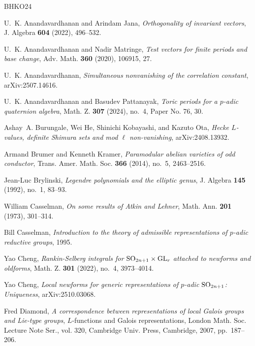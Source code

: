 \documentclass[12pt]{amsart}
\theoremstyle{definition}
\theoremstyle{remark}
\begin{document}
\begin{thebibliography}{BHKO24}

U.~K. Anandavardhanan and Arindam Jana, \emph{Orthogonality of invariant
  vectors}, J. Algebra \textbf{604} (2022), 496--532. 

U.~K. Anandavardhanan and Nadir Matringe, \emph{Test vectors for finite periods
  and base change}, Adv. Math. \textbf{360} (2020), 106915, 27. 
  
U.~K. Anandavardhanan, \emph{Simultaneous nonvanishing of the correlation
  constant}, arXiv:2507.14616.

U.~K. Anandavardhanan and Basudev Pattanayak, \emph{Toric periods for a
  {$p$}-adic quaternion algebra}, Math. Z. \textbf{307} (2024), no.~4, Paper
  No. 76, 30. 

Ashay~A. Burungale, Wei He, Shinichi Kobayashi, and Kazuto Ota, \emph{Hecke
  {$L$}-values, definite {S}himura sets and mod $\ell$ non-vanishing}, arXiv:2408.13932.

Armand Brumer and Kenneth Kramer, \emph{Paramodular abelian varieties of odd
  conductor}, Trans. Amer. Math. Soc. \textbf{366} (2014), no.~5, 2463--2516.

Jean-Luc Brylinski, \emph{Legendre polynomials and the elliptic genus}, J.
  Algebra \textbf{145} (1992), no.~1, 83--93. 

William Casselman, \emph{On some results of {A}tkin and {L}ehner}, Math. Ann.
  \textbf{201} (1973), 301--314. 

Bill Casselman, \emph{Introduction to the theory of admissible representations
  of $p$-adic reductive groups}, 1995.

Yao Cheng, \emph{Rankin-{S}elberg integrals for {${\rm SO}_{2n+1} \times {\rm
  GL}_r$} attached to newforms and oldforms}, Math. Z. \textbf{301} (2022),
  no.~4, 3973--4014. 

Yao Cheng, \emph{Local newforms for generic representations of $p$-adic {${\rm
  SO}_{2n+1}$}: Uniqueness}, arXiv:2510.03068.

Fred Diamond, \emph{A correspondence between representations of local {G}alois
  groups and {L}ie-type groups}, {$L$}-functions and {G}alois representations,
  London Math. Soc. Lecture Note Ser., vol. 320, Cambridge Univ. Press,
  Cambridge, 2007, pp.~187--206. 


\end{thebibliography}
\end{document}
